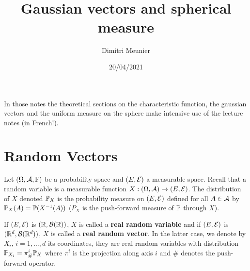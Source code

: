 \documentclass{article}
\title{Gaussian vectors and spherical measure}
\author{Dimitri Meunier}
\date{20/04/2021}
\begin{document}
\maketitle



In those notes the theoretical sections on the characteristic function, the
gaussian vectors and the uniform measure on the sphere  make intensive use of
the lecture notes \citet{le2006integration} (in French!).

\section{Random Vectors}

Let $(\Omega,\cA,\P)$ be a probability space and $(E,\cE)$ a measurable space.
Recall that a random variable is a measurable function $X:(\Omega,\cA) \to
(E,\cE)$. The distribution of $X$ denoted $\P_X$ is the probability measure on
$(E,\cE)$ defined for all $A \in \cA$ by $\P_X(A) = \P(X^{-1}(A))$ ($P_X$ is the
push-forward measure of $\P$ through $X$).

If $(E,\cE)$ is $(\R,\cB(\R))$, $X$ is called a \textbf{real random
variable} and if $(E,\cE)$ is $(\Rd,\cB(\Rd))$, $X$ is called a
\textbf{real random vector}. In the latter case, we denote by $X_i$,
$i=1,\ldots,d$ its coordinates, they are real random variables with distribution
$\P_{X_i} = \pi^i_{\#}\P_X$ where $\pi^i$ is the projection along axis $i$ and
$\#$ denotes the push-forward operator.
\end{document}
